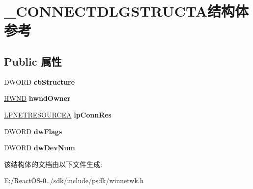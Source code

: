 \hypertarget{struct___c_o_n_n_e_c_t_d_l_g_s_t_r_u_c_t_a}{}\section{\+\_\+\+C\+O\+N\+N\+E\+C\+T\+D\+L\+G\+S\+T\+R\+U\+C\+T\+A结构体 参考}
\label{struct___c_o_n_n_e_c_t_d_l_g_s_t_r_u_c_t_a}
\subsection*{Public 属性}
\begin{DoxyCompactItemize}
\item 
\mbox{\label{struct___c_o_n_n_e_c_t_d_l_g_s_t_r_u_c_t_a_a823770a70cdeac1904621fd119007270}} 
D\+W\+O\+RD {\bfseries cb\+Structure}
\item 
\mbox{\label{struct___c_o_n_n_e_c_t_d_l_g_s_t_r_u_c_t_a_aab6de5306ac70d6a231f9f8ba36a525e}} 
\hyperlink{interfacevoid}{H\+W\+ND} {\bfseries hwnd\+Owner}
\item 
\mbox{\label{struct___c_o_n_n_e_c_t_d_l_g_s_t_r_u_c_t_a_a99eaac621bd980a3cdda29bd609a7490}} 
\hyperlink{struct___n_e_t_r_e_s_o_u_r_c_e_a}{L\+P\+N\+E\+T\+R\+E\+S\+O\+U\+R\+C\+EA} {\bfseries lp\+Conn\+Res}
\item 
\mbox{\label{struct___c_o_n_n_e_c_t_d_l_g_s_t_r_u_c_t_a_a55295058c11a1a0bebff4c7f6a618b41}} 
D\+W\+O\+RD {\bfseries dw\+Flags}
\item 
\mbox{\label{struct___c_o_n_n_e_c_t_d_l_g_s_t_r_u_c_t_a_a0047240b56e63c71dadd3c6ef60be8a8}} 
D\+W\+O\+RD {\bfseries dw\+Dev\+Num}
\end{DoxyCompactItemize}


该结构体的文档由以下文件生成\+:\begin{DoxyCompactItemize}
\item 
E\+:/\+React\+O\+S-\/0../sdk/include/psdk/winnetwk.\+h\end{DoxyCompactItemize}
